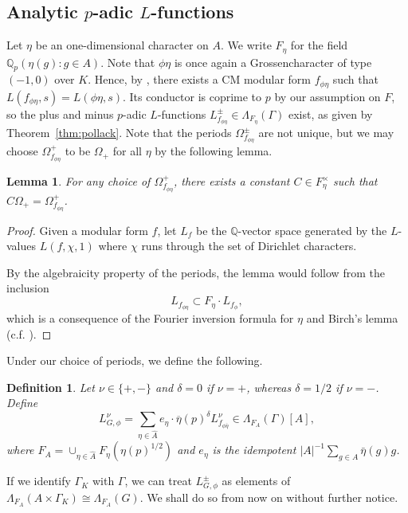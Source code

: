 \documentclass{amsart}
\newtheorem{lemma}[theorem]{Lemma}
\newtheorem{definition}[theorem]{Definition}
\begin{document}
\subsection{Analytic $p$-adic $L$-functions}

Let $\eta$ be an one-dimensional character on $A$. We write $F_\eta$ for the field ${{\mathbb Q}_p}(\eta(g):g\in A)$. Note that $\phi\eta$ is once again a Grossencharacter of type $(-1,0)$ over $K$. Hence, by \cite[Theorem~3.4]{ribet77}, there exists a CM modular form $f_{\phi\eta}$ such that $L(f_{\phi\eta},s)=L(\phi\eta,s)$. Its conductor is coprime to $p$ by our assumption on $F$, so the plus and minus $p$-adic $L$-functions $L^\pm_{f_{\phi\eta}}\in\Lambda_{F_\eta}(\Gamma)$ exist, as given by Theorem~\ref{thm:pollack}. Note that the periods $\Omega^\pm_{f_{\phi\eta}}$ are not unique, but we may choose $\Omega^+_{f_{\phi\eta}}$ to be $\Omega_+$ for all $\eta$ by the following lemma.

\begin{lemma}
For any choice of $\Omega^+_{f_{\phi\eta}}$, there exists a constant $C\in F_\eta^\times$ such that $C\Omega_+=\Omega^+_{f_{\phi\eta}}$.
\end{lemma}
\begin{proof}
Given a modular form $f$, let $L_f$ be the ${\mathbb Q}$-vector space generated by the $L$-values $L(f,\chi,1)$ where $\chi$ runs through the set of Dirichlet characters.

By the algebraicity property of the periods, the lemma would follow from the inclusion
\[
L_{f_{\phi\eta}}\subset F_\eta\cdot L_{f_\phi},
\]
which is a consequence of the Fourier inversion formula for $\eta$ and Birch's lemma (c.f. \cite[\S4]{haran}).
\end{proof}

Under our choice of periods, we define the following.

\begin{definition}
Let $\nu\in\{+,-\}$ and $\delta=0$ if $\nu=+$, whereas $\delta=1/2$ if $\nu=-$. Define
\[
L^\nu_{G,\phi}=\sum_{\eta\in\hat{A}}e_\eta\cdot \overline{\eta}(p)^{\delta} L^\nu_{f_{\phi\bar{\eta}}}\in \Lambda_{F_A}(\Gamma)[A],
\]
where $F_A=\cup_{\eta\in\hat{A}}F_\eta(\eta(p)^{1/2})$ and $e_\eta$ is the idempotent $|A|^{-1}\sum_{g\in A} \bar{\eta}(g)g$.
\end{definition}

 If we identify $\Gamma_K$ with $\Gamma$, we can treat $L^\pm_{G,\phi}$ as elements of $\Lambda_{F_A}(A\times\Gamma_K)\cong\Lambda_{F_A}(G)$. We shall do so from now on without further notice.
\end{document}
